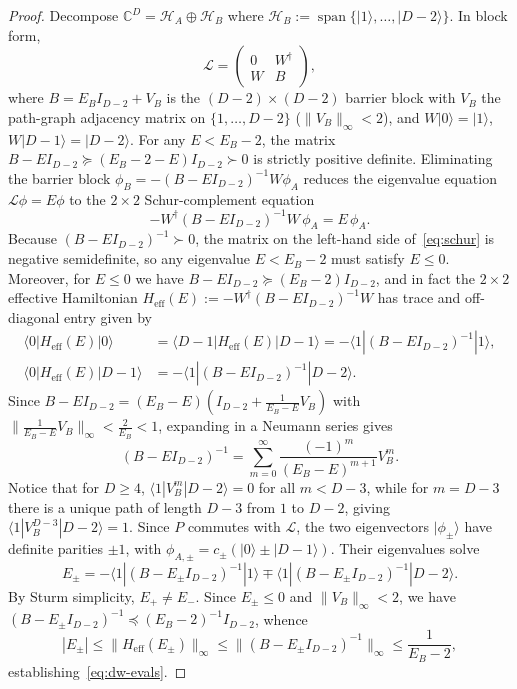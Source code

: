 \documentclass[11pt,a4paper]{article}
\numberwithin{equation}{section}
\theoremstyle{plain}
\theoremstyle{definition}
\begin{document}
\begin{proof}
Decompose $\mathbb{C}^D = \mathcal{H}_A \oplus \mathcal{H}_B$ where $\mathcal{H}_B := \operatorname{span}\{|1\rangle,\dots,|D-2\rangle\}$. In block form,
\[
  \mathcal{L} = \begin{pmatrix} 0 & W^\dagger \\ W & B \end{pmatrix},
\]
where $B = E_B I_{D-2} + V_B$ is the $(D-2)\times(D-2)$ barrier block with $V_B$ the path-graph adjacency matrix on $\{1,\dots,D-2\}$ ($\|V_B\|_\infty < 2$), and $W|0\rangle = |1\rangle$, $W|D-1\rangle = |D-2\rangle$. For any $E < E_B - 2$, the matrix $B - E I_{D-2} \succeq (E_B - 2 - E)I_{D-2} \succ 0$ is strictly positive definite. Eliminating the barrier block $\phi_B = -(B - E I_{D-2})^{-1} W \phi_A$ reduces the eigenvalue equation $\mathcal{L}\phi = E\phi$ to the $2\times 2$ Schur-complement equation
\begin{equation}\label{eq:schur}
  -W^\dagger (B - E I_{D-2})^{-1} W\,\phi_A = E\,\phi_A.
\end{equation}
Because $(B - E I_{D-2})^{-1} \succ 0$, the matrix on the left-hand side of~\eqref{eq:schur} is negative semidefinite, so any eigenvalue $E < E_B - 2$ must satisfy $E \le 0$. Moreover, for $E\le 0$ we have $B - E I_{D-2} \succeq (E_B - 2)I_{D-2}$, and in fact the $2\times 2$ effective Hamiltonian $H_{\mathrm{eff}}(E) := -W^\dagger(B - E I_{D-2})^{-1}W$ has trace and off-diagonal entry given by
\begin{align*}
  \langle 0|H_{\mathrm{eff}}(E)|0\rangle &= \langle D-1|H_{\mathrm{eff}}(E)|D-1\rangle = -\langle 1|(B - E I_{D-2})^{-1}|1\rangle, \\
  \langle 0|H_{\mathrm{eff}}(E)|D-1\rangle &= -\langle 1|(B - E I_{D-2})^{-1}|D-2\rangle.
\end{align*}
Since $B - E I_{D-2} = (E_B - E)(I_{D-2} + \frac{1}{E_B-E}V_B)$ with $\|\frac{1}{E_B-E}V_B\|_\infty < \frac{2}{E_B} < 1$, expanding in a Neumann series gives
\[
  (B - E I_{D-2})^{-1} = \sum_{m=0}^\infty \frac{(-1)^m}{(E_B - E)^{m+1}} V_B^m.
\]
Notice that for $D\ge 4$, $\langle 1|V_B^m|D-2\rangle = 0$ for all $m < D-3$, while for $m = D-3$ there is a unique path of length $D-3$ from $1$ to $D-2$, giving $\langle 1|V_B^{D-3}|D-2\rangle = 1$. Since $P$ commutes with $\mathcal{L}$, the two eigenvectors $|\phi_\pm\rangle$ have definite parities $\pm 1$, with $\phi_{A,\pm} = c_\pm(|0\rangle \pm |D-1\rangle)$. Their eigenvalues solve
\[
  E_\pm = -\langle 1|(B - E_\pm I_{D-2})^{-1}|1\rangle \mp \langle 1|(B - E_\pm I_{D-2})^{-1}|D-2\rangle.
\]
By Sturm simplicity, $E_+ \ne E_-$. Since $E_\pm \le 0$ and $\|V_B\|_\infty < 2$, we have $(B - E_\pm I_{D-2})^{-1} \preceq (E_B - 2)^{-1} I_{D-2}$, whence
\[
  |E_\pm| \le \|H_{\mathrm{eff}}(E_\pm)\|_\infty \le \|(B - E_\pm I_{D-2})^{-1}\|_\infty \le \frac{1}{E_B - 2},
\]
establishing~\eqref{eq:dw-evals}.


\end{proof}
\end{document}
